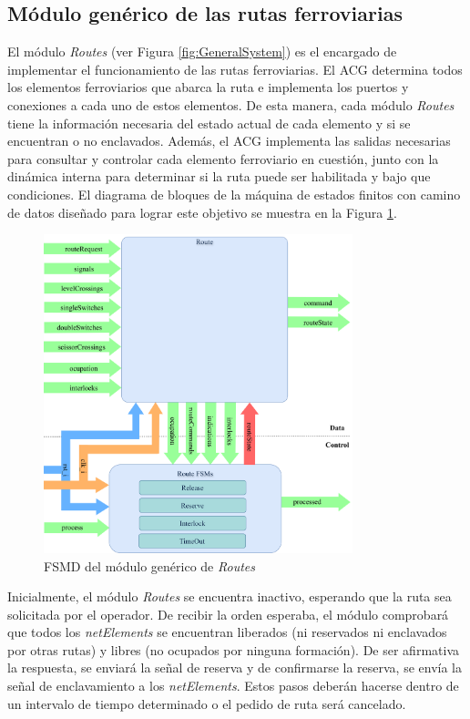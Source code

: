 \subsection{Módulo genérico de las rutas ferroviarias}
	\label{sec:ACG_rts}
	
	El módulo \textit{Routes} (ver Figura \ref{fig:GeneralSystem}) es el encargado de implementar el funcionamiento de las rutas ferroviarias. El ACG determina todos los elementos ferroviarios que abarca la ruta e implementa los puertos y conexiones a cada uno de estos elementos. De esta manera, cada módulo \textit{Routes} tiene la información necesaria del estado actual de cada elemento y si se encuentran o no enclavados. Además, el ACG implementa las salidas necesarias para consultar y controlar cada elemento ferroviario en cuestión, junto con la dinámica interna para determinar si la ruta puede ser habilitada y bajo que condiciones. El diagrama de bloques de la máquina de estados finitos con camino de datos diseñado para lograr este objetivo se muestra en la Figura \ref{fig:RTS_module}.
	
	\begin{figure}[H]
		\centering
		\includegraphics[width=0.8\textwidth]{Figuras/RTS_module}
		\centering\caption{FSMD del módulo genérico de \textit{Routes}}
		\label{fig:RTS_module}
	\end{figure}
	
	Inicialmente, el módulo \textit{Routes} se encuentra inactivo, esperando que la ruta sea solicitada por el operador. De recibir la orden esperaba, el módulo comprobará que todos los \textit{netElements} se encuentran liberados (ni reservados ni enclavados por otras rutas) y libres (no ocupados por ninguna formación). De ser afirmativa la respuesta, se enviará la señal de reserva y de confirmarse la reserva, se envía la señal de enclavamiento a los \textit{netElements}. Estos pasos deberán hacerse dentro de un intervalo de tiempo determinado o el pedido de ruta será cancelado.
	
